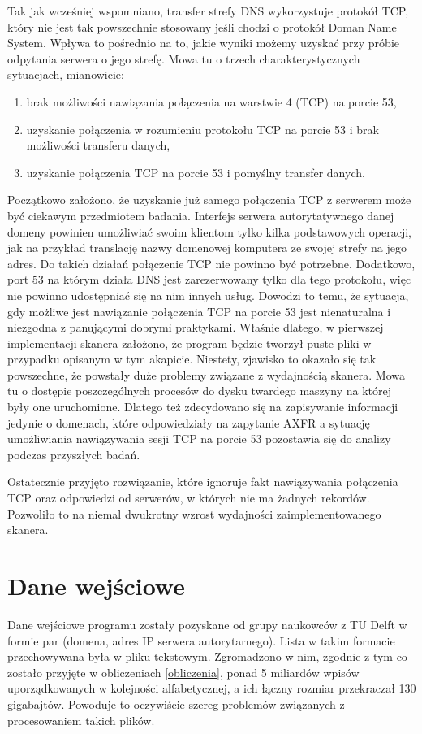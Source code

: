 Tak jak wcześniej wspomniano, transfer strefy DNS wykorzystuje protokół TCP, który nie jest tak powszechnie stosowany jeśli chodzi
o protokół Doman Name System. Wpływa to pośrednio na to, jakie wyniki możemy uzyskać przy próbie odpytania serwera o jego strefę. Mowa tu o
trzech charakterystycznych sytuacjach, mianowicie:
\begin{enumerate}
	\item brak możliwości nawiązania połączenia na warstwie 4 (TCP) na porcie 53,
	\item uzyskanie połączenia w rozumieniu protokołu TCP na porcie 53 i brak możliwości transferu danych,
	\item uzyskanie połączenia TCP na porcie 53 i pomyślny transfer danych.
\end{enumerate}

Początkowo założono, że uzyskanie już samego połączenia TCP z serwerem może być ciekawym przedmiotem badania. Interfejs serwera
autorytatywnego danej domeny powinien umożliwiać swoim klientom tylko kilka podstawowych operacji, jak na przykład translację nazwy
domenowej komputera ze swojej strefy na jego adres. Do takich działań połączenie TCP nie powinno być potrzebne. Dodatkowo, port 53 na którym działa
DNS jest zarezerwowany tylko dla tego protokołu, więc nie powinno udostępniać się na nim innych usług. Dowodzi to temu, że sytuacja,
gdy możliwe jest nawiązanie połączenia TCP na porcie 53 jest nienaturalna i niezgodna z panującymi dobrymi praktykami. Właśnie dlatego,
w pierwszej implementacji skanera założono, że program będzie tworzył puste pliki w przypadku opisanym w tym akapicie. Niestety,
zjawisko to okazało się tak powszechne, że powstały duże problemy związane z wydajnością skanera. Mowa tu o dostępie poszczególnych
procesów do dysku twardego maszyny na której były one uruchomione. Dlatego też zdecydowano się na zapisywanie informacji jedynie o
domenach, które odpowiedziały na zapytanie AXFR a sytuację umożliwiania nawiązywania sesji TCP na porcie 53 pozostawia się do analizy
podczas przyszłych badań.

Ostatecznie przyjęto rozwiązanie, które ignoruje fakt nawiązywania połączenia TCP oraz odpowiedzi od serwerów, w których nie ma
żadnych rekordów. Pozwoliło to na niemal dwukrotny wzrost wydajności zaimplementowanego skanera.

\section{Dane wejściowe}
\label{inputData}
\noindent Dane wejściowe programu zostały pozyskane od grupy naukowców z TU Delft \cite{delft} w formie par (domena, adres IP serwera
autorytarnego). Lista w takim formacie przechowywana była w pliku tekstowym. Zgromadzono w nim, zgodnie z tym co zostało przyjęte
w obliczeniach \ref{obliczenia}, ponad 5 miliardów wpisów uporządkowanych w kolejności alfabetycznej, a ich łączny rozmiar przekraczał
130 gigabajtów. Powoduje to oczywiście szereg problemów związanych z procesowaniem takich plików. \cite{(??skaddane)}

